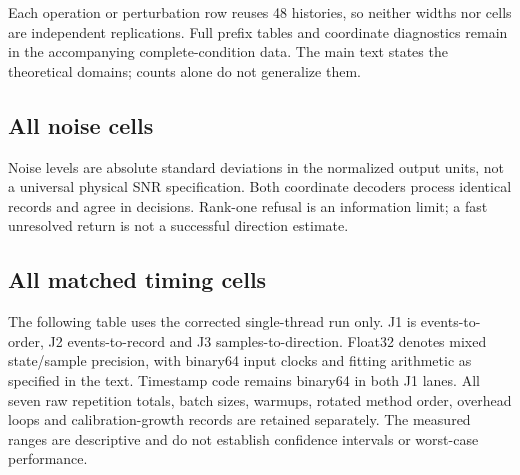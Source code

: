 Each operation or perturbation row reuses 48 histories, so neither widths nor cells are independent replications. Full prefix tables and coordinate diagnostics remain in the accompanying complete-condition data. The main text states the theoretical domains; counts alone do not generalize them.



\subsection{All noise cells}
Noise levels are absolute standard deviations in the normalized output units, not a universal physical SNR specification. Both coordinate decoders process identical records and agree in decisions. Rank-one refusal is an information limit; a fast unresolved return is not a successful direction estimate.


\subsection{All matched timing cells}
The following table uses the corrected single-thread run only. J1 is events-to-order, J2 events-to-record and J3 samples-to-direction. Float32 denotes mixed state/sample precision, with binary64 input clocks and fitting arithmetic as specified in the text. Timestamp code remains binary64 in both J1 lanes. All seven raw repetition totals, batch sizes, warmups, rotated method order, overhead loops and calibration-growth records are retained separately. The measured ranges are descriptive and do not establish confidence intervals or worst-case performance.

